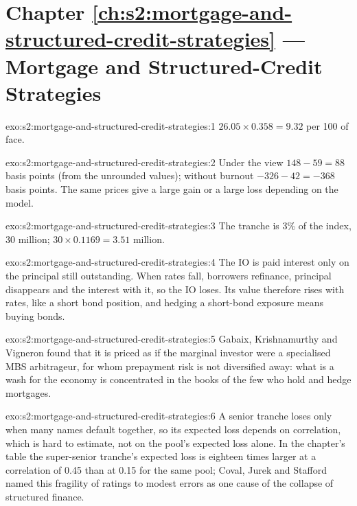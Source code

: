 \section*{Chapter \ref{ch:s2:mortgage-and-structured-credit-strategies} --- Mortgage and Structured-Credit Strategies}

\begin{solution}{exo:s2:mortgage-and-structured-credit-strategies:1}
$26.05 \times 0.358 = 9.32$ per 100 of face.
\end{solution}

\begin{solution}{exo:s2:mortgage-and-structured-credit-strategies:2}
Under the view $148 - 59 = 88$ basis points (from the unrounded values); without burnout $-326 - 42 = -368$ basis points. The same prices give a
large gain or a large loss depending on the model.
\end{solution}

\begin{solution}{exo:s2:mortgage-and-structured-credit-strategies:3}
The tranche is 3\% of the index, 30 million; $30 \times 0.1169 = 3.51$ million.
\end{solution}

\begin{solution}{exo:s2:mortgage-and-structured-credit-strategies:4}
The IO is paid interest only on the principal still outstanding. When rates fall, borrowers refinance, principal disappears and the interest
with it, so the IO loses. Its value therefore rises with rates, like a short bond position, and hedging a short-bond exposure means buying bonds.
\end{solution}

\begin{solution}{exo:s2:mortgage-and-structured-credit-strategies:5}
Gabaix, Krishnamurthy and Vigneron found that it is priced as if the marginal investor were a specialised MBS arbitrageur, for whom prepayment risk is
not diversified away: what is a wash for the economy is concentrated in the books of the few who hold and hedge mortgages.
\end{solution}

\begin{solution}{exo:s2:mortgage-and-structured-credit-strategies:6}
A senior tranche loses only when many names default together, so its expected loss depends on correlation, which is hard to estimate, not on the
pool's expected loss alone. In the chapter's table the super-senior tranche's expected loss is eighteen times larger at a correlation of 0.45 than
at 0.15 for the same pool; Coval, Jurek and Stafford named this fragility of ratings to modest errors as one cause of the collapse of structured
finance.
\end{solution}

